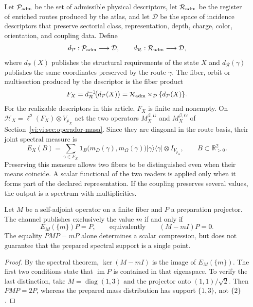 Let \(\mathcal P_{\rm adm}\) be the set of admissible physical descriptors,
let \(\mathcal R_{\rm adm}\) be the register of enriched routes produced by
the atlas, and let \(\mathcal D\) be the space of incidence descriptors that
preserve sectorial class, representation, depth, charge, color,
orientation, and coupling data. Define
\[
 d_{\mathcal P}:\mathcal P_{\rm adm}\longrightarrow\mathcal D,
 \qquad
 d_{\mathcal R}:\mathcal R_{\rm adm}\longrightarrow\mathcal D,
\]
where \(d_{\mathcal P}(X)\) publishes the structural requirements of the state
\(X\) and \(d_{\mathcal R}(\gamma)\) publishes the same coordinates preserved
by the route \(\gamma\). The fiber, orbit or multisection produced by the
descriptor is the fiber product
\begin{equation}
 F_X=d_{\mathcal R}^{-1}\!\bigl(d_{\mathcal P}(X)\bigr)
 =\mathcal R_{\rm adm}\times_{\mathcal D}\{d_{\mathcal P}(X)\}.
 \label{vi:vi:eq:fibra-descriptor}
\end{equation}
For the realizable descriptors in this article, \(F_X\) is finite and nonempty.
On
\(\mathcal H_X=\ell^2(F_X)\otimes V_{\rho_X}\) act the two operators
\(M_X^{\beta,D}\) and \(M_X^{\beta,\Omega}\) of
Section~\ref{vi:vi:sec:operador-masa}. Since they are diagonal in the route
basis, their joint spectral measure is
\begin{equation}
 E_X(B)=\sum_{\gamma\in F_X}
 \mathbf1_B\bigl(m_D(\gamma),m_\Omega(\gamma)\bigr)
 |\gamma\rangle\langle\gamma|\otimes I_{V_{\rho_X}},
 \qquad B\subset\mathbb R_{>0}^2.
 \label{vi:vi:eq:familias-pvm}
\end{equation}
Preserving this measure allows two fibers to be distinguished even when their means
coincide. A scalar functional of the two readers is applied only
when it forms part of the declared representation. If the coupling
preserves several values, the output is a spectrum with multiplicities.

\begin{proposition}
\label{vi:vi:prop:familias-linea}
Let \(M\) be a self-adjoint operator on a finite fiber and \(P\) a
preparation projector. The channel publishes exclusively the value \(m\)
if and only if
\[
 E_M(\{m\})P=P,
 \qquad\text{equivalently}\qquad (M-mI)P=0.
\]
The equality \(PMP=mP\) alone determines a scalar compression,
but does not guarantee that the prepared spectral support is a single point.
\end{proposition}
\begin{proof}
By the spectral theorem, \(\ker(M-mI)\) is the image of
\(E_M(\{m\})\). The first two conditions state that
\(\operatorname{im}P\) is contained in that eigenspace. To verify
the last distinction, take \(M=\operatorname{diag}(1,3)\) and the projector
onto \((1,1)/\sqrt2\). Then \(PMP=2P\), whereas the prepared
mass distribution has support \(\{1,3\}\), not \(\{2\}\).
\end{proof}

